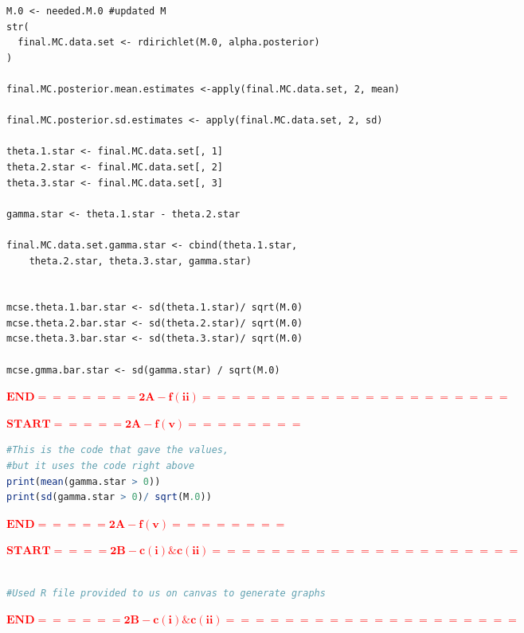 \documentclass[12pt]{article}
\newcommand{\tcr}[1]{\textcolor{red}{#1}}
\begin{document}
\begin{lstlisting}
M.0 <- needed.M.0 #updated M
str(
  final.MC.data.set <- rdirichlet(M.0, alpha.posterior)
)

final.MC.posterior.mean.estimates <-apply(final.MC.data.set, 2, mean)

final.MC.posterior.sd.estimates <- apply(final.MC.data.set, 2, sd)

theta.1.star <- final.MC.data.set[, 1]
theta.2.star <- final.MC.data.set[, 2]
theta.3.star <- final.MC.data.set[, 3]

gamma.star <- theta.1.star - theta.2.star

final.MC.data.set.gamma.star <- cbind(theta.1.star, 
    theta.2.star, theta.3.star, gamma.star)


mcse.theta.1.bar.star <- sd(theta.1.star)/ sqrt(M.0)
mcse.theta.2.bar.star <- sd(theta.2.star)/ sqrt(M.0)
mcse.theta.3.bar.star <- sd(theta.3.star)/ sqrt(M.0)

mcse.gmma.bar.star <- sd(gamma.star) / sqrt(M.0)
\end{lstlisting}
\tcr{$\bm{END ======= 2A - f(ii) =====================}$}
\vspace*{1in}

\tcr{$\bm{START ===== 2A - f(v)========}$}
\begin{lstlisting}[language = R]
#This is the code that gave the values,
#but it uses the code right above
print(mean(gamma.star > 0))
print(sd(gamma.star > 0)/ sqrt(M.0))
\end{lstlisting}
\tcr{$\bm{END ===== 2A - f(v)========}$}

\vspace*{1in}

\tcr{$\bm{START ==== 2B - c(i) \& c(ii) =====================}$}
\begin{lstlisting}[language = R]

#Used R file provided to us on canvas to generate graphs

\end{lstlisting}
\tcr{$\bm{END ====== 2B - c(i) \& c(ii)====================}$}
\end{document}
